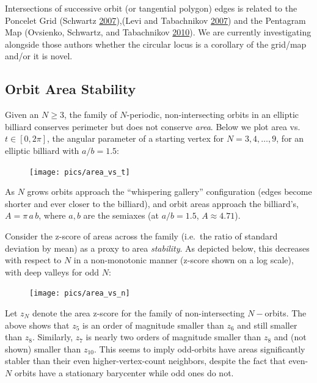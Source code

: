 \documentclass[]{article}
\begin{document}
Intersections of successive orbit (or tangential polygon) edges is related to the Poncelet Grid (Schwartz \protect\hyperlink{ref-schwartz07}{2007}),(Levi and Tabachnikov \protect\hyperlink{ref-sergei07_grid}{2007}) and the Pentagram Map (Ovsienko, Schwartz, and Tabachnikov \protect\hyperlink{ref-sergei10_pentagram}{2010}). We are currently investigating alongside those authors whether the circular locus is a corollary of the grid/map and/or it is novel.

\hypertarget{orbit-area-stability}{%
\subsection{Orbit Area Stability}\label{orbit-area-stability}}

Given an \(N\geq3\), the family of \(N\)-periodic, non-intersecting orbits in an elliptic billiard conserves perimeter but does not conserve \emph{area}. Below we plot area vs. \(t\in[0,2\pi]\), the angular parameter of a starting vertex for \(N=3,4,\ldots,9\), for an elliptic billiard with \(a/b=1.5\):

\begin{figure}[H]

{\centering \texttt{[image: pics/area\_vs\_t]} 

}

\end{figure}

As \(N\) grows orbits approach the ``whispering gallery'' configuration (edges become shorter and ever closer to the billiard), and orbit areas approach the billiard's, \(A=\pi\,a\,b\), where \(a,b\) are the semiaxes (at \(a/b=1.5\), \(A\approx 4.71\)).

Consider the z-score of areas across the family (i.e.~the ratio of standard deviation by mean) as a proxy to area \emph{stability}. As depicted below, this decreases with respect to \(N\) in a non-monotonic manner (z-score shown on a log scale), with deep valleys for odd \(N\):

\begin{figure}[H]

{\centering \texttt{[image: pics/area\_vs\_n]} 

}

\end{figure}

Let \(z_N\) denote the area z-score for the family of non-intersecting \(N-\)orbits. The above shows that \(z_5\) is an order of magnitude smaller than \(z_6\) and still smaller than \(z_8\). Similarly, \(z_7\) is nearly two orders of magnitude smaller than \(z_8\) and (not shown) smaller than \(z_{10}\). This seems to imply odd-orbits have areas significantly stabler than their even higher-vertex-count neighbors, despite the fact that even-\(N\) orbits have a stationary barycenter while odd ones do not.
\end{document}
